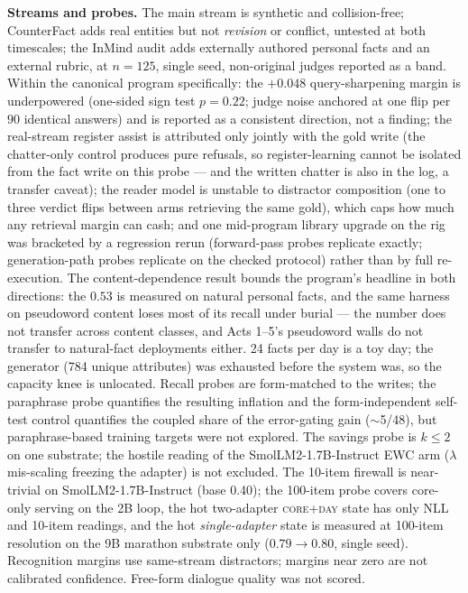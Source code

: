 \documentclass[11pt]{article}
\newcommand{\smol}{SmolLM2-1.7B-Instruct}
\begin{document}
\textbf{Streams and probes.} The main stream is synthetic and collision-free; CounterFact adds
real entities but not \emph{revision} or conflict, untested at both timescales; the InMind audit
adds externally authored personal facts and an external rubric, at $n{=}125$, single seed,
non-original judges reported as a band. Within the canonical program specifically: the
$+0.048$ query-sharpening margin is underpowered (one-sided sign test $p{=}0.22$; judge
noise anchored at one flip per $90$ identical answers) and is reported as a consistent
direction, not a finding; the real-stream register assist is attributed only jointly
with the gold write (the chatter-only control produces pure refusals, so
register-learning cannot be isolated from the fact write on this probe --- and the
written chatter is also in the log, a transfer caveat); the reader model is unstable to distractor composition (one to three
verdict flips between arms retrieving the same gold), which caps how much any retrieval
margin can cash; and one mid-program library upgrade on the rig was bracketed by a
regression rerun (forward-pass probes replicate exactly; generation-path probes replicate
on the checked protocol) rather than by full re-execution. The content-dependence result
bounds the program's headline in both directions: the $0.53$ is measured on natural personal
facts, and the same harness on pseudoword content loses most of its recall under burial ---
the number does not transfer across content classes, and Acts 1--5's pseudoword walls do
not transfer to natural-fact deployments either. 24 facts per day
is a toy day; the generator (784 unique attributes) was exhausted before the system was, so the
capacity knee is unlocated. Recall probes are form-matched to the writes; the paraphrase probe
quantifies the resulting inflation and the form-independent self-test control quantifies the
coupled share of the error-gating gain ($\sim$5/48), but paraphrase-based training targets were
not explored. The savings probe is $k\le2$ on one substrate; the hostile reading of the \smol{}
EWC arm ($\lambda$ mis-scaling freezing the adapter) is not excluded. The 10-item firewall is
near-trivial on \smol{} (base 0.40); the 100-item probe covers core-only serving on the 2B
loop, the hot two-adapter \textsc{core+day} state has only NLL and 10-item readings, and the
hot \emph{single-adapter} state is measured at 100-item resolution on the 9B marathon substrate
only ($0.79\to0.80$, single seed). Recognition margins use same-stream distractors; margins near zero are
not calibrated confidence. Free-form dialogue quality was not scored.
\end{document}
